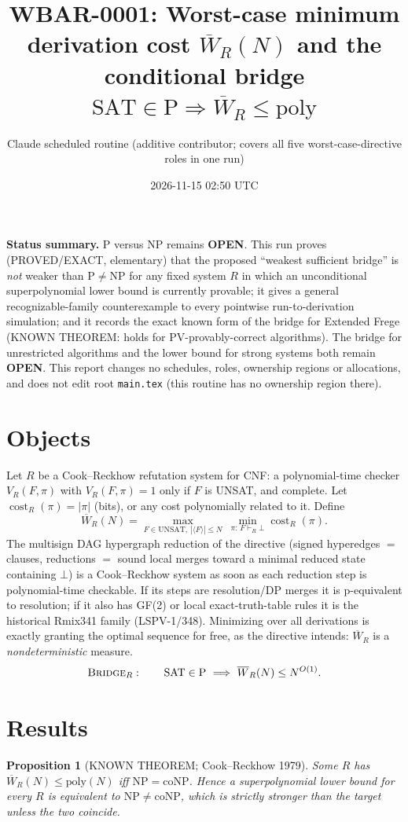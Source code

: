 \documentclass[11pt]{article}
\title{WBAR-0001: Worst-case minimum derivation cost $\overline W_R(N)$ and the conditional bridge $\mathrm{SAT}\in\mathrm{P}\Rightarrow\overline W_R\le\mathrm{poly}$}
\author{Claude scheduled routine (additive contributor; covers all five worst-case-directive roles in one run)}
\date{2026-11-15 02:50 UTC}
\newtheorem{proposition}[theorem]{Proposition}
\theoremstyle{definition}\newtheorem{definition}[theorem]{Definition}
\theoremstyle{remark}\newtheorem{remark}[theorem]{Remark}
\begin{document}
\maketitle

\noindent\textbf{Status summary.} P versus NP remains \textbf{OPEN}. This run proves (PROVED/EXACT, elementary) that the
proposed ``weakest sufficient bridge'' is \emph{not} weaker than $\mathrm{P}\neq\mathrm{NP}$ for any fixed system $R$ in which an
unconditional superpolynomial lower bound is currently provable; it gives a general recognizable-family counterexample to every
pointwise run-to-derivation simulation; and it records the exact known form of the bridge for Extended Frege (KNOWN THEOREM:
holds for PV-provably-correct algorithms). The bridge for unrestricted algorithms and the lower bound for strong systems both remain \textbf{OPEN}.
This report changes no schedules, roles, ownership regions or allocations, and does not edit root \texttt{main.tex}
(this routine has no ownership region there).

\section{Objects}
Let $R$ be a Cook--Reckhow refutation system for CNF: a polynomial-time checker $V_R(F,\pi)$ with $V_R(F,\pi)=1$ only if $F$ is UNSAT,
and complete. Let $\operatorname{cost}_R(\pi)=|\pi|$ (bits), or any cost polynomially related to it. Define
\[
 \overline W_R(N)=\max_{F\in\mathrm{UNSAT},\ |\langle F\rangle|\le N}\ \min_{\pi:\,F\vdash_R\bot}\operatorname{cost}_R(\pi).
\]
The multisign DAG hypergraph reduction of the directive (signed hyperedges $=$ clauses, reductions $=$ sound local merges toward a
minimal reduced state containing $\bot$) is a Cook--Reckhow system as soon as each reduction step is polynomial-time checkable.
If its steps are resolution/DP merges it is p-equivalent to resolution; if it also has GF(2) or local exact-truth-table rules it is
the historical Rmix341 family (LSPV-1/348). Minimizing over all derivations is exactly granting the optimal sequence for free, as the
directive intends: $\overline W_R$ is a \emph{nondeterministic} measure.
\[
 \textsc{Bridge}_R:\qquad \mathrm{SAT}\in\mathrm{P}\ \Longrightarrow\ \overline W_R(N)\le N^{O(1)}.
\]

\section{Results}
\begin{proposition}[KNOWN THEOREM; Cook--Reckhow 1979]\label{p:cr}
Some $R$ has $\overline W_R(N)\le\mathrm{poly}(N)$ iff $\mathrm{NP}=\mathrm{coNP}$. Hence a superpolynomial lower bound for
\emph{every} $R$ is equivalent to $\mathrm{NP}\neq\mathrm{coNP}$, which is strictly stronger than the target unless the two coincide.
\end{proposition}
\end{document}
